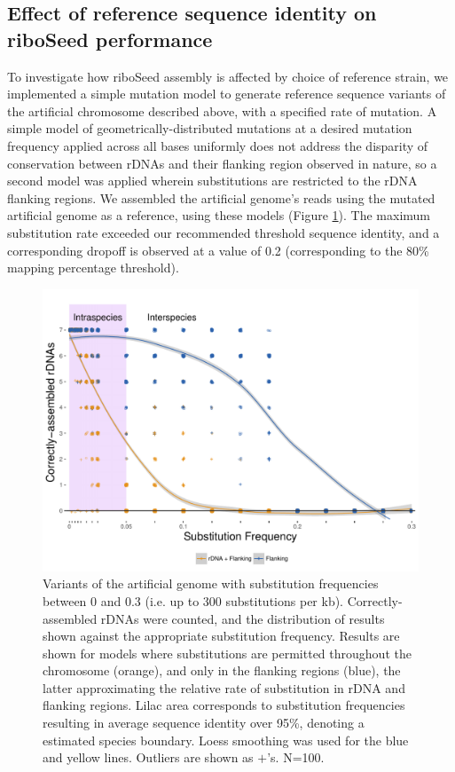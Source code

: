 \documentclass[a4,center,fleqn]{NAR}
\begin{document}
\subsection*{Effect of reference sequence identity on riboSeed performance}
To investigate how riboSeed assembly is affected by choice of reference strain, we implemented a simple mutation model to generate reference sequence variants of the artificial chromosome described above, with a specified rate of mutation. A simple model of geometrically-distributed mutations at a desired mutation frequency applied across all bases uniformly does not address the disparity of conservation between rDNAs and their flanking region observed in nature, so a second model was applied wherein substitutions are restricted to the rDNA flanking regions. We assembled the artificial genome's reads using the mutated artificial genome as a reference, using these models (Figure \ref{fig:degen}). The maximum substitution rate exceeded our recommended threshold sequence identity, and a corresponding dropoff is observed at a value of 0.2 (corresponding to the 80\% mapping percentage threshold).

\begin{figure}[!b]
  \centering
    \includegraphics[width=.9\columnwidth]{degenerate_lineplot}
  \caption{Variants of the artificial genome with substitution frequencies between 0 and 0.3 (i.e. up to 300 substitutions per kb). Correctly-assembled rDNAs were counted, and the distribution of results shown against the appropriate substitution frequency. Results are shown for models where substitutions are permitted throughout the chromosome (orange), and only in the flanking regions (blue), the latter approximating the relative rate of substitution in rDNA and flanking regions. Lilac area corresponds to substitution frequencies resulting in average sequence identity over 95\%, denoting a estimated species boundary. Loess smoothing was used for the blue and yellow lines. Outliers are shown as $+$'s. N=100.}
  \label{fig:degen}
\end{figure}
\end{document}
